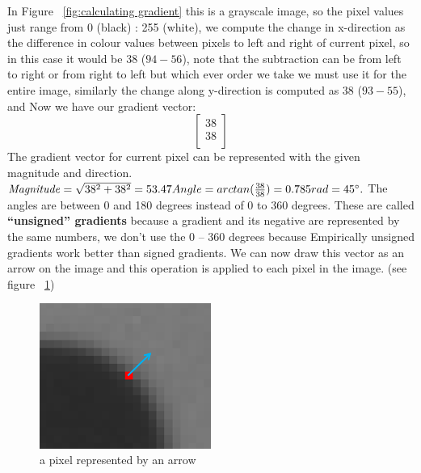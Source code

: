 In Figure ~\ref{fig:calculating gradient} this is a grayscale image, so the pixel values just range from 0 (black) : 255 (white), we compute the change in x-direction as the difference in colour values between pixels to left and right of current pixel, so in this case it would be 38 ($94 - 56$), note that the subtraction can be from left to right or from right to left but which ever order we take we must use it for the entire image, similarly the change along y-direction is computed as 38 ($93 - 55$), and Now we have our gradient vector:
\[ \begin{bmatrix}
38\\
38\\
\end{bmatrix} \]
The gradient vector for current pixel can be represented with the given magnitude and direction.
\newline \newline
\begin{math}
\mathit{Magnitude} = 
\sqrt{38^2 +  38^2} = 53.47 \newline Angle = arctan(\frac{38}{38}) = 0.785 rad = 45 \degree.
\end{math}
\newline \newline
The angles are between 0 and 180 degrees instead of 0 to 360 degrees. These are called \textbf{“unsigned” gradients} because a gradient and its negative are represented by the same numbers, we don’t use the 0 – 360 degrees because Empirically unsigned gradients work better than signed gradients.
\newline
We can now draw this vector as an arrow on the image and this operation is applied to each pixel in the image. (see figure ~\ref{fig:pixel representation})

\begin{figure}
	\centering
	\includegraphics[width=0.5\textwidth]{images/gray_scale.png}
	\caption{a pixel represented by an arrow}
	\label{fig:pixel representation}
\end{figure}

